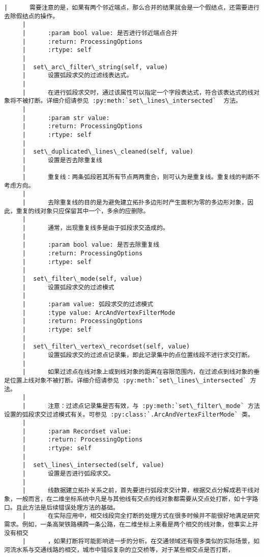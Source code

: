 \documentclass[11pt]{article}
\begin{document}
\begin{Verbatim}[commandchars=\\\{\}]
     |      需要注意的是，如果有两个邻近端点，那么合并的结果就会是一个假结点，还需要进行去除假结点的操作。
     |      
     |      :param bool value: 是否进行邻近端点合并
     |      :return: ProcessingOptions
     |      :rtype: self
     |  
     |  set\_arc\_filter\_string(self, value)
     |      设置弧段求交的过滤线表达式。
     |      
     |      在进行弧段求交时，通过该属性可以指定一个字段表达式，符合该表达式的线对象将不被打断。详细介绍请参见 :py:meth:`set\_lines\_intersected`  方法。
     |      
     |      :param str value:
     |      :return: ProcessingOptions
     |      :rtype: self
     |  
     |  set\_duplicated\_lines\_cleaned(self, value)
     |      设置是否去除重复线
     |      
     |      重复线：两条弧段若其所有节点两两重合，则可认为是重复线。重复线的判断不考虑方向。
     |      
     |      去除重复线的目的是为避免建立拓扑多边形时产生面积为零的多边形对象，因此，重复的线对象只应保留其中一个，多余的应删除。
     |      
     |      通常，出现重复线多是由于弧段求交造成的。
     |      
     |      :param bool value: 是否去除重复线
     |      :return: ProcessingOptions
     |      :rtype: self
     |  
     |  set\_filter\_mode(self, value)
     |      设置弧段求交的过滤模式
     |      
     |      :param value: 弧段求交的过滤模式
     |      :type value: ArcAndVertexFilterMode
     |      :return: ProcessingOptions
     |      :rtype: self
     |  
     |  set\_filter\_vertex\_recordset(self, value)
     |      设置弧段求交的过滤点记录集，即此记录集中的点位置线段不进行求交打断。
     |      
     |      如果过滤点在线对象上或到线对象的距离在容限范围内，在过滤点到线对象的垂足位置上线对象不被打断。详细介绍请参见 :py:meth:`set\_lines\_intersected` 方法。
     |      
     |      注意：过滤点记录集是否有效，与 :py:meth:`set\_filter\_mode` 方法设置的弧段求交过滤模式有关。可参见 :py:class:`.ArcAndVertexFilterMode` 类。
     |      
     |      :param Recordset value:
     |      :return: ProcessingOptions
     |      :rtype: self
     |  
     |  set\_lines\_intersected(self, value)
     |      设置是否进行弧段求交。
     |      
     |      线数据建立拓扑关系之前，首先要进行弧段求交计算，根据交点分解成若干线对象，一般而言，在二维坐标系统中凡是与其他线有交点的线对象都需要从交点处打断，如十字路口。且此方法是后续错误处理方法的基础。
     |      在实际应用中，相交线段完全打断的处理方式在很多时候并不能很好地满足研究需求。例如，一条高架铁路横跨一条公路，在二维坐标上来看是两个相交的线对象，但事实上并没有相交
     |      ，如果打断将可能影响进一步的分析。在交通领域还有很多类似的实际场景，如河流水系与交通线路的相交，城市中错综复杂的立交桥等，对于某些相交点是否打断，

\end{Verbatim}
\end{document}

